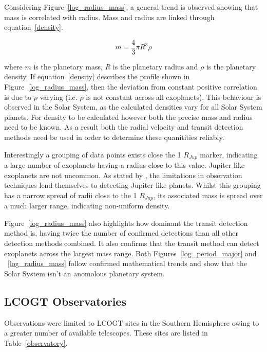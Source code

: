 \documentclass[twoside,4pt]{article}
\begin{document}
\begin{multicols}{2}
Considering Figure~\ref{log_radius_mass}, a general trend is observed showing that mass is correlated with radius. Mass and radius are linked through equation~\ref{density}.

\begin{equation} \label{density}
    m = \frac{4}{3}\pi R^3 \rho
\end{equation}

 where $m$ is the planetary mass, $R$ is the planetary radius and $\rho$ is the planetary density. If equation~\ref{density} describes the profile shown in Figure~\ref{log_radius_mass}, then the deviation from constant positive correlation is due to $\rho$ varying (i.e. $\rho$ is not constant across all exoplanets). This behaviour is observed in the Solar System, as the calculated densities vary for all Solar System planets. For density to be calculated however both the precise mass and radius need to be known. As a result both the radial velocity and transit detection methods need be used in order to determine these quanitities reliably.

 Interestingly a grouping of data points exists close the 1 $R_{Jup}$ marker, indicating a large number of exoplanets having a radius close to this value. Jupiter like exoplanets are not uncommon. As stated by \textcite{stats}, the limitations in observation techniques lend themselves to detecting Jupiter like planets. Whilst this grouping has a narrow spread of radii close to the 1 $R_{Jup}$, its associated mass is spread over a much larger range, indicating non-uniform density.

 Figure~\ref{log_radius_mass} also highlights how dominant the transit detection method is, having twice the number of confirmed detections than all other detection methods combined. It also confirms that the transit method can detect exoplanets across the largest mass range. Both Figures~\ref{log_period_major} and ~\ref{log_radius_mass} follow confirmed mathematical trends and show that the Solar System isn't an anomolous planetary system.


\subsection{LCOGT Observatories}
Observations were limited to LCOGT sites in the Southern Hemisphere owing to a greater number of available telescopes. These sites are listed in Table~\ref{observatory}.


\end{multicols}
\end{document}
